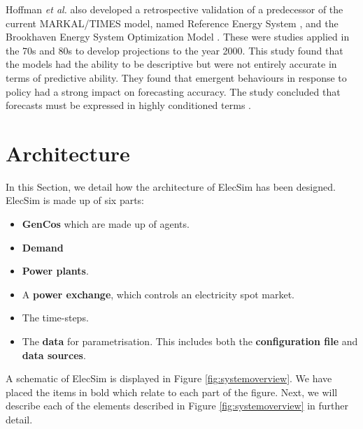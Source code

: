 Hoffman \textit{et al.} also developed a retrospective validation of a predecessor of the current MARKAL\slash TIMES model, named Reference Energy System \cite{Hoffman_1973}, and the Brookhaven Energy System Optimization Model \cite{ERDA_48}. These were studies applied in the 70s and 80s to develop projections to the year 2000. This study found that the models had the ability to be descriptive but were not entirely accurate in terms of predictive ability. They found that emergent behaviours in response to policy had a strong impact on forecasting accuracy. The study concluded that forecasts must be expressed in highly conditioned terms \cite{Hoffman2011}. 




















\clearpage
\section{Architecture}
\label{elecsim:sec:architecture}

In this Section, we detail how the architecture of ElecSim has been designed. ElecSim is made up of six parts: 
\begin{itemize}
	\item \textbf{GenCos} which are made up of agents.
	\item \textbf{Demand}
	\item \textbf{Power plants}.
	\item A \textbf{power exchange}, which controls an electricity spot market.
	\item The time-steps.
	\item The \textbf{data} for parametrisation. This includes both the \textbf{configuration file} and \textbf{data sources}.
\end{itemize}

A schematic of ElecSim is displayed in Figure \ref{fig:systemoverview}. We have placed the items in bold which relate to each part of the figure. Next, we will describe each of the elements described in Figure \ref{fig:systemoverview} in further detail.

